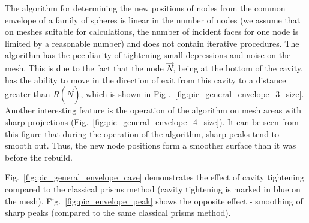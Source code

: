 \documentclass[
11pt,%
tightenlines,%
twoside,%
onecolumn,%
nofloats,%
nobibnotes,%
nofootinbib,%
superscriptaddress,%
noshowpacs,%
centertags]%
{revtex4}
\begin{document}
The algorithm for determining the new positions of nodes from the common envelope of a family of spheres is linear in the number of nodes (we assume that on meshes suitable for calculations, the number of incident faces for one node is limited by a reasonable number) and does not contain iterative procedures.
The algorithm has the peculiarity of tightening small depressions and noise on the mesh.
This is due to the fact that the node $\vec{N}$, being at the bottom of the cavity, has the ability to move in the direction of exit from this cavity to a distance greater than $R(\vec{N})$, which is shown in Fig .~\ref{fig:pic_general_envelope_3_size}.
Another interesting feature is the operation of the algorithm on mesh areas with sharp projections (Fig.~\ref{fig:pic_general_envelope_4_size}).
It can be seen from this figure that during the operation of the algorithm, sharp peaks tend to smooth out.
Thus, the new node positions form a smoother surface than it was before the rebuild.

Fig.~\ref{fig:pic_general_envelope_cave} demonstrates the effect of cavity tightening compared to the classical prisms method (cavity tightening is marked in blue on the mesh).
Fig.~\ref{fig:pic_envelope_peak} shows the opposite effect - smoothing of sharp peaks (compared to the same classical prisms method).
\end{document}
